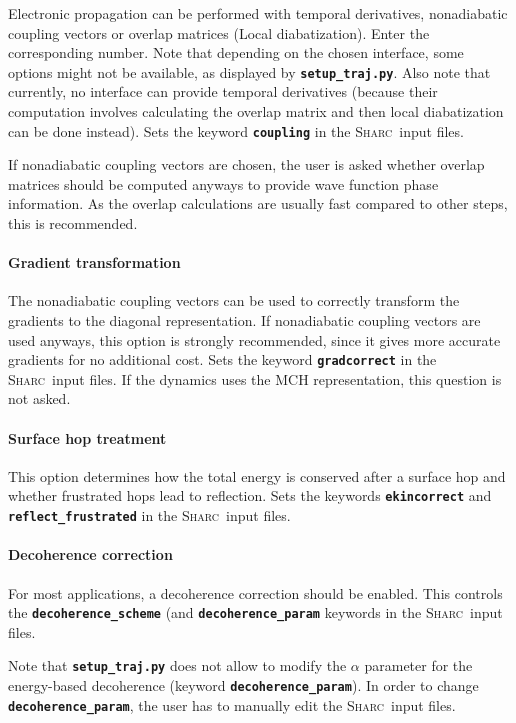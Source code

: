 \documentclass[a4paper,10pt,DIV=15,openany]{scrbook}
\newcommand{\sharc}{\textsc{Sharc}}
\newcommand{\ttt}[1]{\textbf{\texttt{#1}}}
\begin{document}
Electronic propagation can be performed with temporal derivatives, nonadiabatic coupling vectors or overlap matrices (Local diabatization). Enter the corresponding number. Note that depending on the chosen interface, some options might not be available, as displayed by \ttt{setup\_traj.py}. Also note that currently, no interface can provide temporal derivatives (because their computation involves calculating the overlap matrix and then local diabatization can be done instead). Sets the keyword \ttt{coupling} in the \sharc\ input files.

If nonadiabatic coupling vectors are chosen, the user is asked whether overlap matrices should be computed anyways to provide wave function phase information. As the overlap calculations are usually fast compared to other steps, this is recommended.

\paragraph{Gradient transformation}

The nonadiabatic coupling vectors can be used to correctly transform the gradients to the diagonal representation. If nonadiabatic coupling vectors are used anyways, this option is strongly recommended, since it gives more accurate gradients for no additional cost. Sets the keyword \ttt{gradcorrect} in the \sharc\ input files. If the dynamics uses the MCH representation, this question is not asked. 

\paragraph{Surface hop treatment}

This option determines how the total energy is conserved after a surface hop and whether frustrated hops lead to reflection. Sets the keywords \ttt{ekincorrect} and \ttt{reflect\_frustrated} in the \sharc\ input files.

\paragraph{Decoherence correction}

For most applications, a decoherence correction should be enabled. This controls the \ttt{decoherence\_scheme} (and \ttt{decoherence\_param} keywords in the \sharc\ input files. 

Note that \ttt{setup\_traj.py} does not allow to modify the $\alpha$ parameter for the energy-based decoherence (keyword \ttt{decoherence\_param}). In order to change \ttt{decoherence\_param}, the user has to manually edit the \sharc\ input files.
\end{document}
